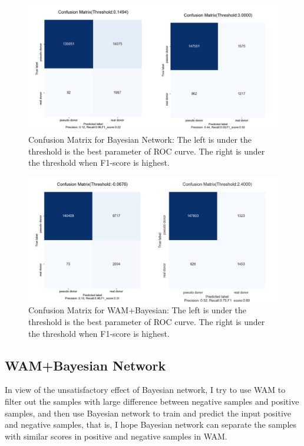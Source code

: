 \documentclass{gapd}
\begin{document}
\begin{figure}
  \centering
  \includegraphics[width=0.8\linewidth]{assets/image-20210624154725944.png}
  \caption{Confusion Matrix for Bayesian Network: The left is under the threshold is
  the best parameter of ROC curve. The right is under the threshold when
  F1-score is highest.}
  \label{fig:BNmatrix}
\end{figure}
  
\begin{figure}
\centering
\includegraphics[width=0.8\linewidth]{assets/image-20210624154819817.png}
\caption{Confusion Matrix for WAM+Bayesian: The left is under the
threshold is the best parameter of ROC curve. The right is under the
threshold when F1-score is highest.}
\label{fig:WBmatrix}
\end{figure}


\subsection{WAM+Bayesian Network}\label{wambayesian-network}

In view of the unsatisfactory effect of Bayesian network, I try to use
WAM to filter out the samples with large difference between negative
samples and positive samples, and then use Bayesian network to train and
predict the input positive and negative samples, that is, I hope
Bayesian network can separate the samples with similar scores in
positive and negative samples in WAM.
\end{document}

